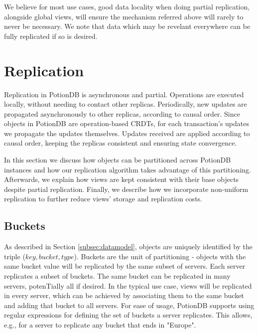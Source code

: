 \documentclass[sigplan,10pt]{acmart}
\begin{document}
We believe for most use cases, good data locality when doing partial replication, alongside global views, will ensure the mechanism referred above will rarely to never be necessary.
We note that data which may be revelant everywhere can be fully replicated if so is desired.

\section{Replication}
\label{sec:replication}
Replication in PotionDB is asynchronous and partial.
Operations are executed locally, without needing to contact other replicas.
Periodically, new updates are propagated asynchronously to other replicas, according to causal order.
Since objects in PotionDB are operation-based CRDTs, for each transaction's updates we propagate the updates themselves.
Updates received are applied according to causal order, keeping the replicas consistent and ensuring state convergence.

In this section we discuss how objects can be partitioned across PotionDB instances and how our replication algorithm takes advantage of this partitioning.
Afterwards, we explain how views are kept consistent with their base objects despite partial replication.
Finally, we describe how we incorporate non-uniform replication to further reduce views' storage and replication costs.

\subsection{Buckets}
\label{subsec:buckets}
As described in Section \ref{subsec:datamodel}, objects are uniquely identified by the triple ($key, bucket, type$).
Buckets are the unit of partitioning - objects with the same bucket value will be replicated by the same subset of servers.
Each server replicates a subset of buckets.
The same bucket can be replicated in many servers, potenTially all if desired.
In the typical use case, views will be replicated in every server, which can be achieved by associating them to the same bucket and adding that bucket to all servers.
For ease of usage, PotionDB supports using regular expressions for defining the set of buckets a server replicates.
This allows, e.g., for a server to replicate any bucket that ends in "Europe".
\end{document}
